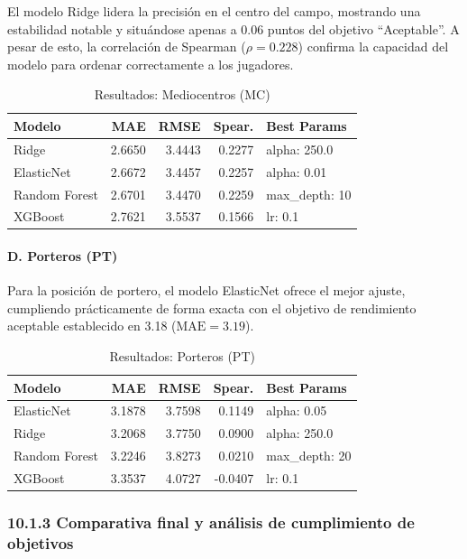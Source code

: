 El modelo Ridge lidera la precisión en el centro del campo, 
mostrando una estabilidad notable y situándose apenas a 0.06 
puntos del objetivo ``Aceptable''. A pesar de esto, la correlación 
de Spearman ($\rho = 0.228$) confirma la capacidad del modelo 
para ordenar correctamente a los jugadores.

\begin{table}[H]
\centering
\small
\begin{tabular}{|l|r|r|r|p{3cm}|}
\hline
\textbf{Modelo} & \textbf{MAE} & \textbf{RMSE} & \textbf{Spear.} & 
\textbf{Best Params} \\
\hline
Ridge & 2.6650 & 3.4443 & 0.2277 & alpha: 250.0 \\
ElasticNet & 2.6672 & 3.4457 & 0.2257 & alpha: 0.01 \\
Random Forest & 2.6701 & 3.4470 & 0.2259 & max\_depth: 10 \\
XGBoost & 2.7621 & 3.5537 & 0.1566 & lr: 0.1 \\
\hline
\end{tabular}
\caption{Resultados: Mediocentros (MC)}
\end{table}


\paragraph{D. Porteros (PT)}

Para la posición de portero, el modelo ElasticNet ofrece el mejor 
ajuste, cumpliendo prácticamente de forma exacta con el objetivo 
de rendimiento aceptable establecido en 3.18 
($\text{MAE} = 3.19$).

\begin{table}[H]
\centering
\small
\begin{tabular}{|l|r|r|r|p{3cm}|}
\hline
\textbf{Modelo} & \textbf{MAE} & \textbf{RMSE} & \textbf{Spear.} & 
\textbf{Best Params} \\
\hline
ElasticNet & 3.1878 & 3.7598 & 0.1149 & alpha: 0.05 \\
Ridge & 3.2068 & 3.7750 & 0.0900 & alpha: 250.0 \\
Random Forest & 3.2246 & 3.8273 & 0.0210 & max\_depth: 20 \\
XGBoost & 3.3537 & 4.0727 & -0.0407 & lr: 0.1 \\
\hline
\end{tabular}
\caption{Resultados: Porteros (PT)}
\end{table}


\subsubsection{10.1.3 Comparativa final y análisis de cumplimiento de objetivos}


